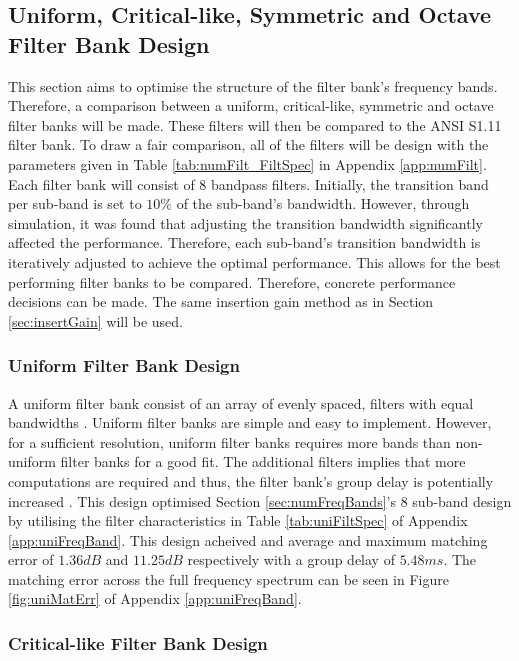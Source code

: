 \documentclass[11pt,onecolumn]{witseiepaper}
\begin{document}
\subsection{Uniform, Critical-like, Symmetric and Octave Filter Bank Design}
\label{sec:uniCritSymOct}

\noindent This section aims to optimise the structure of the filter bank's frequency bands. Therefore, a comparison between a uniform, critical-like, symmetric and octave filter banks will be made. These filters will then be compared to the ANSI S1.11 filter bank. To draw a fair comparison, all of the filters will be design with the parameters given in Table \ref{tab:numFilt_FiltSpec} in Appendix \ref{app:numFilt}. Each filter bank will consist of $8$ bandpass filters. Initially, the transition band per sub-band is set to $10\%$ of the sub-band's bandwidth. However, through simulation, it was found that adjusting the transition bandwidth significantly affected the performance. Therefore, each sub-band's transition bandwidth is iteratively adjusted to achieve the optimal performance. This allows for the best performing filter banks to be compared. Therefore, concrete performance decisions can be made. The same insertion gain method as in Section \ref{sec:insertGain} will be used.

\subsubsection{Uniform Filter Bank Design}
\label{sec:uniDesign}

\noindent A uniform filter bank consist of an array of evenly spaced, filters with equal bandwidths \cite{chang}. Uniform filter banks are simple and easy to implement. However, for a sufficient resolution, uniform filter banks requires more bands than non-uniform filter banks for a good fit. The additional filters implies that more computations are required and thus, the filter bank's group delay is potentially increased \cite{brennan}. This design optimised  Section \ref{sec:numFreqBands}'s $8$ sub-band design by utilising the filter characteristics in Table \ref{tab:uniFiltSpec} of Appendix \ref{app:uniFreqBand}. This design acheived and average and maximum matching error of $1.36dB$ and $11.25dB$ respectively with a group delay of $5.48ms$. The matching error across the full frequency spectrum can be seen in Figure \ref{fig:uniMatErr} of Appendix \ref{app:uniFreqBand}.


\subsubsection{Critical-like Filter Bank Design}
\label{sec:critDesign}
\end{document}
